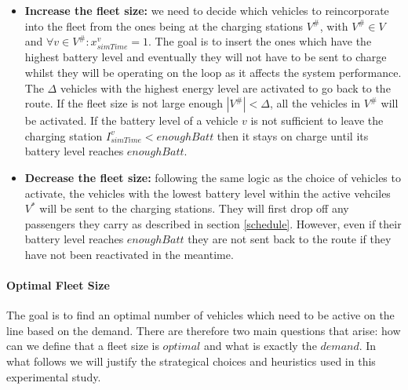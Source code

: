 \documentclass[12pt,a4paper]{article}
\begin{document}
\begin{itemize}
\setlength\itemsep{1pt}
\item \textbf{Increase the fleet size:} we need to decide which vehicles to reincorporate into the fleet from the ones being at the charging stations $V^{\#}$, with $V^{\#} \in V$ and $\forall v \in V^{\#}: x^{v}_{simTime} = 1$. The goal is to insert the ones which have the highest battery level and eventually they will not have to be sent to charge whilst they will be operating on the loop as it affects the system performance. The $\Delta$ vehicles with the highest energy level are activated to go back to the route. If the fleet size is not large enough $|V^{\#}| < \Delta$, all the vehicles in $V^{\#}$ will be activated. If the battery level of a vehicle $v$ is not sufficient to leave the charging station $I_{simTime}^{v} < enoughBatt$ then it stays on charge until its battery level reaches $enoughBatt$.
\item \textbf{Decrease the fleet size:} following the same logic as the choice of vehicles to activate, the vehicles with the lowest battery level within the active vehciles $V^{*}$ will be sent to the charging stations. They will first drop off any passengers they carry as described in section \ref{schedule}. However, even if their battery level reaches $enoughBatt$ they are not sent back to the route if they have not been reactivated in the meantime.
\end{itemize}

\paragraph{Optimal Fleet Size} The goal is to find an optimal number of vehicles which need to be active on the line based on the demand. There are therefore two main questions that arise: how can we define that a fleet size is $optimal$ and what is exactly the $demand$. In what follows we will justify the strategical choices and heuristics used in this experimental study.
\end{document}
